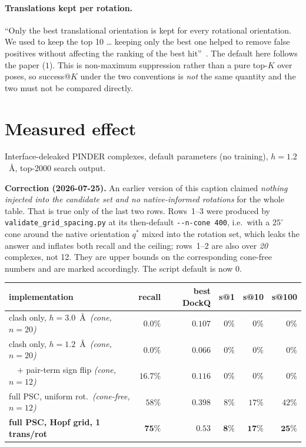 \documentclass[11pt,a4paper]{article}
\begin{document}
\paragraph{Translations kept per rotation.}
``Only the best translational orientation is kept for every rotational
orientation. We used to keep the top 10 \ldots{} keeping only the best one
helped to remove false positives without affecting the ranking of the best
hit''~\cite{ChenWeng2003psc}. The default here follows the paper ($1$). This is
non-maximum suppression rather than a pure top-$K$ over poses, so success@$K$
under the two conventions is \emph{not} the same quantity and the two must not
be compared directly.

\section{Measured effect}

Interface-deleaked PINDER complexes, default parameters (no training),
$h = 1.2$~\AA, top-2000 search output.

\textbf{Correction (2026-07-25).} An earlier version of this caption claimed
\emph{nothing injected into the candidate set and no native-informed rotations}
for the whole table. That is true only of the last two rows. Rows~1--3 were
produced by \texttt{validate\_grid\_spacing.py} at its then-default
\texttt{-{}-n-cone 400}, i.e.\ with a $25^\circ$ cone around the native
orientation $q^\ast$ mixed into the rotation set, which leaks the answer and
inflates both recall and the ceiling; rows~1--2 are also over \emph{20}
complexes, not 12. They are upper bounds on the corresponding cone-free
numbers and are marked accordingly. The script default is now $0$.

\begin{center}
\begin{tabular}{lrrrrr}
  \toprule
  implementation & recall & best DockQ & s@1 & s@10 & s@100 \\
  \midrule
  clash only, $h=3.0$~\AA\ \emph{(cone, $n{=}20$)} & $0.0\%$  & $0.107$ & $0\%$ & $0\%$ & $0\%$ \\
  clash only, $h=1.2$~\AA\ \emph{(cone, $n{=}20$)} & $0.0\%$  & $0.066$ & $0\%$ & $0\%$ & $0\%$ \\
  \ \ + pair-term sign flip \emph{(cone, $n{=}12$)} & $16.7\%$ & $0.116$ & $0\%$ & $0\%$ & $0\%$ \\
  \midrule
  full PSC, uniform rot.\ \emph{(cone-free, $n{=}12$)} & $58\%$ & $0.398$ & $8\%$ & $17\%$ & $42\%$ \\
  \textbf{full PSC, Hopf grid, 1 trans/rot}
                                         & $\mathbf{75\%}$ & $\mathbf{0.53}$
                                         & $\mathbf{8\%}$ & $\mathbf{17\%}$ & $\mathbf{25\%}$ \\
  \bottomrule
\end{tabular}
\end{center}
\end{document}
